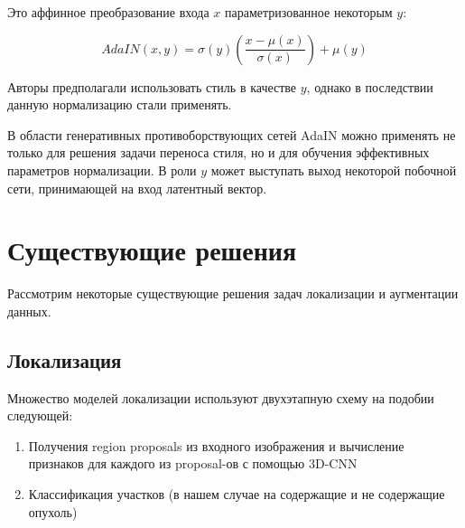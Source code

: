   

Это аффинное преобразование входа $x$ параметризованное некоторым $y$: 

  

\begin{equation} 

AdaIN(x, y) = \sigma(y)(\dfrac{x - \mu(x)}{\sigma(x)}) + \mu(y) \label{eq:adain} 

\end{equation} 

  

Авторы предполагали использовать стиль в качестве $y$, однако в последствии данную нормализацию стали применять. 

  

В области генеративных противоборствующих сетей AdaIN можно применять не только для решения задачи переноса стиля, но и для обучения эффективных параметров нормализации. В роли $y$ может выступать выход некоторой побочной сети, принимающей на вход латентный вектор. 

  

\section{Существующие решения} 

  

Рассмотрим некоторые существующие решения задач локализации и аугментации данных. 

  

\subsection{Локализация} 

  

Множество моделей локализации используют двухэтапную схему \cite{girshick2014rich} на подобии следующей:  

  

\begin{enumerate} 

    \item Получения region proposals из входного изображения и вычисление признаков для каждого из proposal-ов с помощью 3D-CNN 

    \item Классификация участков (в нашем случае на содержащие и не содержащие опухоль) 

\end{enumerate} 

